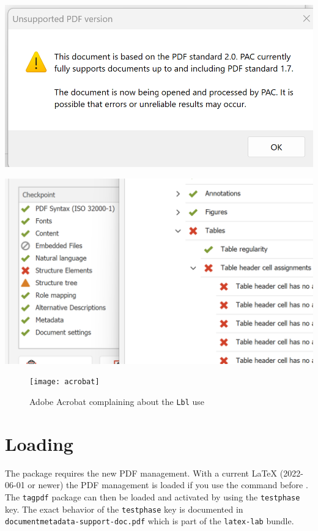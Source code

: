 \documentclass[bibliography=totoc,a4paper]{article}
\newcommand\pkg[1]{\texttt{#1}}
\begin{document}
\includegraphics[alt=PAC 2024 complains about PDF version]{pac2024-version}

\includegraphics[alt=PAC 2024 complains about table header cells]{pac2024-report}

\begin{figure}

\texttt{[image: acrobat]}

\caption{Adobe Acrobat complaining
about the \texttt{Lbl} use}\label{fig:adobe}\par

\end{figure}


\section{Loading}

The package requires the new PDF management. With a current \LaTeX{} (2022-06-01 or newer)
the PDF management is loaded if you use the  command before .
The \pkg{tagpdf} package can then be loaded and activated by using the \texttt{testphase} key. The exact behavior of
the \texttt{testphase} key is documented in \texttt{documentmetadata-support-doc.pdf} which
is part of the \pkg{latex-lab} bundle.
\end{document}
